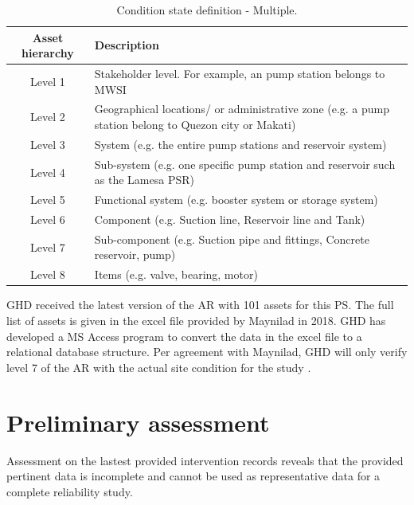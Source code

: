 \begin{table}[h]
	\caption{Condition state definition - Multiple.}
	\label{ch02_tbl_assethierachy}
	{\footnotesize
\begin{tabular}{l|p{10cm}}
	\hline
	\multicolumn{1}{c|}{Asset hierarchy} & Description \\ 
	\hline
	\multicolumn{1}{c|}{Level 1} & Stakeholder level. For example, an pump station belongs to MWSI \\ 
	\multicolumn{1}{c|}{Level 2} & Geographical locations/ or administrative zone (e.g. a pump station belong to Quezon city or Makati) \\ 
	\multicolumn{1}{c|}{Level 3} & System (e.g. the entire pump stations and reservoir system) \\ 
	\multicolumn{1}{c|}{Level 4} & Sub-system (e.g. one specific pump station and reservoir such as the Lamesa PSR) \\ 
	\multicolumn{1}{c|}{Level 5} & Functional system (e.g. booster system or storage system) \\ 
	\multicolumn{1}{c|}{Level 6} & Component (e.g. Suction line, Reservoir line and Tank) \\ 
	\multicolumn{1}{c|}{Level 7} & Sub-component (e.g. Suction pipe and fittings, Concrete reservoir, pump) \\ 
	\multicolumn{1}{c|}{Level 8} & Items (e.g. valve, bearing, motor) \\ 
	\hline
\end{tabular}		
	}
\end{table}

GHD received the latest version of the AR with 101 assets for this PS. The full list of assets is given in the excel file provided by Maynilad in 2018. GHD has developed a MS Access program to convert the data in the excel file to a relational database structure. Per agreement with Maynilad, GHD will only verify level 7 of the AR with the actual site condition for the study \cite{GHD2018m}. 
\section{Preliminary assessment}
\label{22}
Assessment on the lastest provided intervention records reveals that the provided pertinent data is incomplete and cannot be used as representative data for a complete reliability study. %

